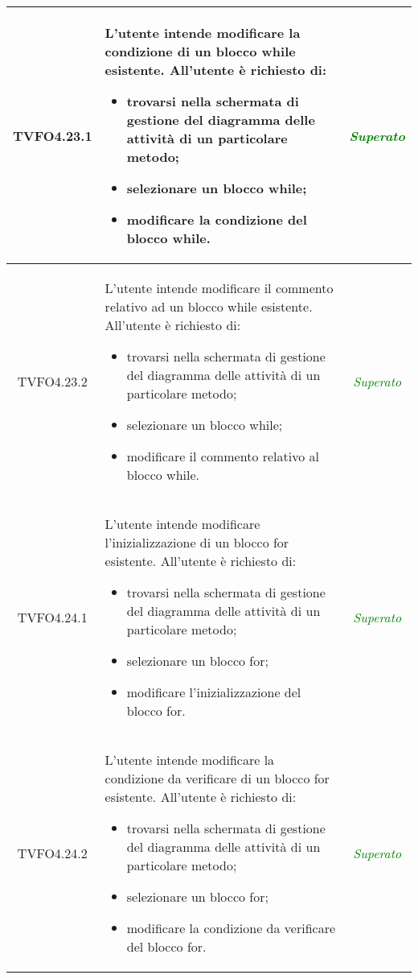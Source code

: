 \begin{longtable}{|c|>{}m{8cm}|c|}
\hypertarget{TVFO4.23.1}{TVFO4.23.1} & L'utente intende modificare la condizione di un blocco while esistente.
All'utente è richiesto di:
\begin{itemize}
\item trovarsi nella schermata di gestione del diagramma delle attività di un particolare metodo;
\item selezionare un blocco while;
\item modificare la condizione del blocco while.
\end{itemize} & \textcolor{Green}{\textit{Superato}}\\ \hline

\hypertarget{TVFO4.23.2}{TVFO4.23.2} & L'utente intende modificare il commento relativo ad un blocco while esistente.
All'utente è richiesto di:
\begin{itemize}
\item trovarsi nella schermata di gestione del diagramma delle attività di un particolare metodo;
\item selezionare un blocco while;
\item modificare il commento relativo al blocco while.
\end{itemize} & \textcolor{Green}{\textit{Superato}}\\ \hline

\hypertarget{TVFO4.24.1}{TVFO4.24.1} & L'utente intende modificare l'inizializzazione di un blocco for esistente.
All'utente è richiesto di:
\begin{itemize}
	\item trovarsi nella schermata di gestione del diagramma delle attività di un particolare metodo; 
	\item selezionare un blocco for; 
	\item modificare l'inizializzazione del blocco for. 
\end{itemize} & \textcolor{Green}{\textit{Superato}}\\ \hline

\hypertarget{TVFO4.24.2}{TVFO4.24.2} & L'utente intende modificare la condizione da verificare di un blocco for esistente.
All'utente è richiesto di:
\begin{itemize}
	\item trovarsi nella schermata di gestione del diagramma delle attività di un particolare metodo;
	\item selezionare un blocco for;
	\item modificare la condizione da verificare del blocco for.
\end{itemize} & \textcolor{Green}{\textit{Superato}}\\ \hline


\end{longtable}
